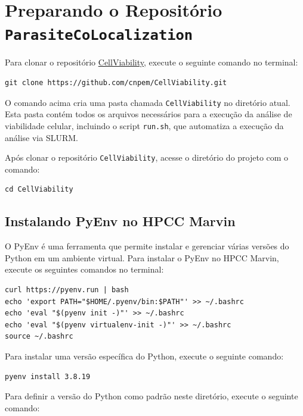 \documentclass{article}
\begin{document}
\section{Preparando o Repositório \texttt{ParasiteCoLocalization}}

Para clonar o repositório \href{https://github.com/cnpem/CellViability}{CellViability}, execute o seguinte comando no terminal:

\begin{verbatim}
git clone https://github.com/cnpem/CellViability.git
\end{verbatim}

O comando acima cria uma pasta chamada \texttt{CellViability} no diretório atual. Esta pasta contém todos os arquivos necessários para a execução da análise de viabilidade celular, incluindo o script \texttt{run.sh}, que automatiza a execução da análise via SLURM.

Após clonar o repositório \texttt{CellViability}, acesse o diretório do projeto com o comando:

\begin{verbatim}
cd CellViability
\end{verbatim}

\subsection{Instalando PyEnv no HPCC Marvin}

O PyEnv é uma ferramenta que permite instalar e gerenciar várias versões do Python em um ambiente virtual. Para instalar o PyEnv no HPCC Marvin, execute os seguintes comandos no terminal:

\begin{verbatim}
curl https://pyenv.run | bash
echo 'export PATH="$HOME/.pyenv/bin:$PATH"' >> ~/.bashrc
echo 'eval "$(pyenv init -)"' >> ~/.bashrc
echo 'eval "$(pyenv virtualenv-init -)"' >> ~/.bashrc
source ~/.bashrc
\end{verbatim}

Para instalar uma versão específica do Python, execute o seguinte comando:

\begin{verbatim}
pyenv install 3.8.19
\end{verbatim}

Para definir a versão do Python como padrão neste diretório, execute o seguinte comando:
\end{document}
